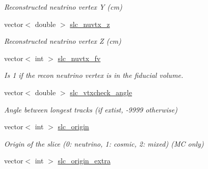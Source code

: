 \begin{DoxyCompactItemize}
\begin{DoxyCompactList}\small\item\em Reconstructed neutrino vertex Y (cm) \end{DoxyCompactList}\item 
\hypertarget{classUBXSecEvent_abc7e1a40fd182e817c83e5e4066eeb07}{vector$<$ double $>$ \hyperlink{classUBXSecEvent_abc7e1a40fd182e817c83e5e4066eeb07}{slc\-\_\-nuvtx\-\_\-z}}\label{classUBXSecEvent_abc7e1a40fd182e817c83e5e4066eeb07}

\begin{DoxyCompactList}\small\item\em Reconstructed neutrino vertex Z (cm) \end{DoxyCompactList}\item 
\hypertarget{classUBXSecEvent_ae5160345d6d863bbe3ad2abb19298dc6}{vector$<$ int $>$ \hyperlink{classUBXSecEvent_ae5160345d6d863bbe3ad2abb19298dc6}{slc\-\_\-nuvtx\-\_\-fv}}\label{classUBXSecEvent_ae5160345d6d863bbe3ad2abb19298dc6}

\begin{DoxyCompactList}\small\item\em Is 1 if the recon neutrino vertex is in the fiducial volume. \end{DoxyCompactList}\item 
\hypertarget{classUBXSecEvent_af9855bb4f1c558d9032c3059beb49015}{vector$<$ double $>$ \hyperlink{classUBXSecEvent_af9855bb4f1c558d9032c3059beb49015}{slc\-\_\-vtxcheck\-\_\-angle}}\label{classUBXSecEvent_af9855bb4f1c558d9032c3059beb49015}

\begin{DoxyCompactList}\small\item\em Angle between longest tracks (if extist, -\/9999 otherwise) \end{DoxyCompactList}\item 
\hypertarget{classUBXSecEvent_aebb1b1e843015c57cd10b411682dbb2e}{vector$<$ int $>$ \hyperlink{classUBXSecEvent_aebb1b1e843015c57cd10b411682dbb2e}{slc\-\_\-origin}}\label{classUBXSecEvent_aebb1b1e843015c57cd10b411682dbb2e}

\begin{DoxyCompactList}\small\item\em Origin of the slice (0\-: neutrino, 1\-: cosmic, 2\-: mixed) (M\-C only) \end{DoxyCompactList}\item 
\hypertarget{classUBXSecEvent_ac1532ccdcb92b158c2393ec6a2a816f8}{vector$<$ int $>$ \hyperlink{classUBXSecEvent_ac1532ccdcb92b158c2393ec6a2a816f8}{slc\-\_\-origin\-\_\-extra}}\label{classUBXSecEvent_ac1532ccdcb92b158c2393ec6a2a816f8}


\end{DoxyCompactItemize}
